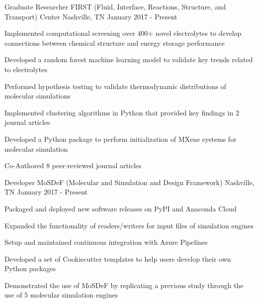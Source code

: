 
\begin{cventries}
  \cventry
    {Graduate Researcher} %
    {FIRST (Fluid, Interface, Reactions, Structure, and Transport) Center} %
    {Nashville, TN} %
    {January 2017 - Present} %
    {
      \begin{cvitems} %
        \item{Implemented computational screening over 400+ novel electrolytes to
        develop \newline
        connections between chemical structure and energy storage performance}
        \item {Developed a random forest machine learning model to validate key trends related to
            electrolytes}
        \item{Performed hypothesis testing to validate thermodynamic
            distributions of molecular simulations}
        \item {Implemented clustering algorithms in Python that
            provided key findings in 2 journal articles}
        \item {Developed a Python package to perform initialization of 
            MXene systems for molecular simulation}
        \item {Co-Authored 8 peer-reviewed journal articles}
      \end{cvitems}
    }

  \cventry
    {Developer} %
    {MoSDeF (Molecular and Simulation and Design Framework)} %
    {Nashville, TN} %
    {January 2017 - Present} %
    {
      \begin{cvitems} %
      \item {Packaged and deployed new software releases on PyPI and Anaconda
          Cloud}
        \item {Expanded the functionality of readers/writers for input files of
            simulation engines}
        \item{Setup and maintained continuous integration with Azure Pipelines}
        \item{Developed a set of Cookiecutter templates to help users develop
            their own Python packages}
        \item{Demonstrated the use of MoSDeF by replicating a previous study
            through the use of 5 molecular simulation engines}
      \end{cvitems}
    }
\end{cventries}
